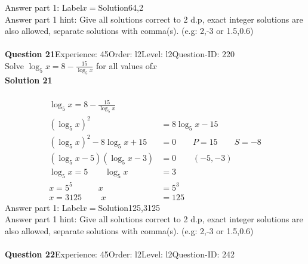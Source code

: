 \documentclass{article}
\begin{document}
Answer part 1: \hspace{10pt}Label\hspace{10pt}$x=$\hspace{10pt}Solution\hspace{10pt}64,2\\
Answer part 1 hint: \hspace{15pt}Give all solutions correct to 2 d.p, exact integer solutions are also allowed, separate solutions with comma(s). (e.g: 2,-3 or 1.5,0.6)\\
\\[4pt]
\noindent\textbf{Question 21}\hspace{20pt}Experience: 45\hspace{20pt}Order: l2\hspace{20pt}Level: l2\hspace{20pt}Question-ID: 220\\[2pt]
Solve $\log_{5}x=8-\displaystyle\frac{15}{\log_5{x}}$ for all values of$x$\\[4pt]
\noindent\textbf{Solution 21}\\[2pt]
\\[-35pt]\begin{align*}
\log_{5}x=8-\displaystyle\frac{15}{\log_5{x}}\\[2pt]
(\log_{5}x)^2&=8\log_{5}x-15\\[2pt]
(\log_{5}x)^2-8\log_{5}x+15&=0\qquad P=15 \qquad S=-8\\[2pt]
(\log_{5}x-5)(\log_{5}x-3)&=0\qquad (-5,-3)\\[2pt]
\log_{5}x=5\qquad\log_{5}x&=3\\[2pt]
x=5^5\hspace{37pt} x&=5^3\\[2pt]
x=3125\hspace{28pt}x&=125
\end{align*}
Answer part 1: \hspace{10pt}Label\hspace{10pt}$x=$\hspace{10pt}Solution\hspace{10pt}125,3125\\
Answer part 1 hint: \hspace{15pt} Give all solutions correct to 2 d.p, exact integer solutions are also allowed, separate solutions with comma(s). (e.g: 2,-3 or 1.5,0.6)\\
\\[4pt]
\noindent\textbf{Question 22}\hspace{20pt}Experience: 45\hspace{20pt}Order: l2\hspace{20pt}Level: l2\hspace{20pt}Question-ID: 242\\[2pt]
\end{document}
